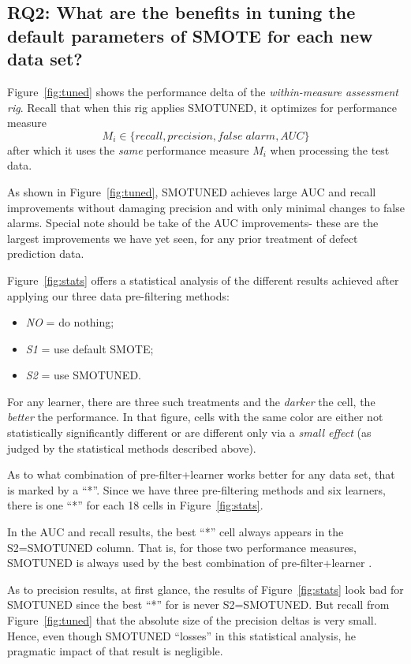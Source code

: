 \documentclass[10pt,conference]{IEEEtran}
\newcommand{\bi}{\begin{itemize}[leftmargin=0.4cm]}
\newcommand{\ei}{\end{itemize}}
\theoremstyle{break}
\theoremstyle{break}
\begin{document}
\subsection {{\bf RQ2}: What are the benefits in tuning the default parameters of SMOTE for each new data set?}

Figure~\ref{fig:tuned} shows the performance delta of the {\em within-measure assessment rig}.
Recall that when this rig applies SMOTUNED, it optimizes for performance measure
\[M_i \in \{ 
\mathit{recall},
\mathit{precision}, 
\mathit{false\; alarm},
\mathit{AUC}
\}
\]
after which it uses the {\em same} performance measure
$M_i$ when processing the test data.

As shown in Figure~\ref{fig:tuned}, 
SMOTUNED achieves large AUC and recall improvements
without
 damaging precision and  with only minimal changes
 to false alarms. Special note should be take of the  AUC improvements- these are the largest improvements
 we have yet seen, for any prior treatment of defect prediction data.

Figure~\ref{fig:stats} offers a statistical analysis
of the different results achieved
after applying our three data pre-filtering methods:
\bi
\item  {\em NO} = do nothing;
\item {\em S1} = use default SMOTE;
\item {\em S2} = use SMOTUNED.
\ei
For any learner, there are three such treatments and the {\em darker} the cell, the {\em better} the performance. 
In that figure, cells with the same color are
either not statistically significantly different or
are different only via a {\em small effect}
(as judged by the statistical methods described above).

As to what combination of pre-filter+learner works better for any data set, that is marked by a ``*''. Since we have three pre-filtering methods and six learners, there is one   ``*'' for each 18 cells in Figure~\ref{fig:stats}.

In the  AUC and recall results,  the best ``*'' cell always appears in the S2=SMOTUNED column. 
That is, for those two performance measures,   SMOTUNED is always
used by the best combination of pre-filter+learner .

As to precision  results,  at first glance, the  results of Figure~\ref{fig:stats} look bad for SMOTUNED since
the best ``*''  for  is never S2=SMOTUNED.
 But recall from Figure~\ref{fig:tuned} that the absolute size of the precision   deltas is very small.  Hence, even though SMOTUNED ``losses'' in this statistical analysis, he pragmatic impact of that result  is  negligible.
 
\end{document}
